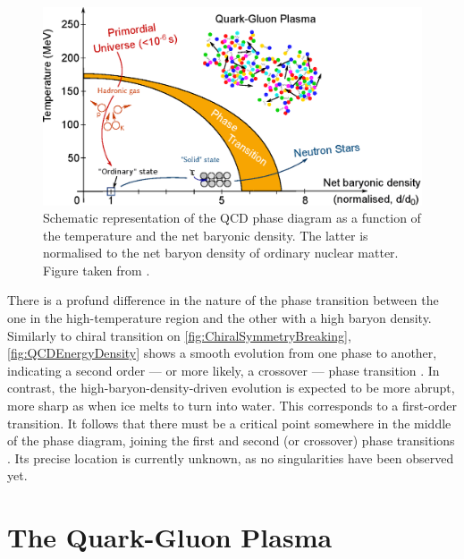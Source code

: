 \begin{figure}[!p]
	\centering
	\includegraphics[width=\textwidth]{Figs/Chapter2/DiagrPhase.eps}
	\caption{Schematic representation of the QCD phase diagram as a function of the temperature and the net baryonic density. The latter is normalised to the net baryon density of ordinary nuclear matter. Figure taken from \cite{mairePhaseDiagramQCD2015}.}
	\label{fig:QCDPhaseDiagram}
\end{figure}

There is a profund difference in the nature of the phase transition between the one in the high-temperature region and the other with a high baryon density. Similarly to chiral transition on \fig\ref{fig:ChiralSymmetryBreaking}, \fig\ref{fig:QCDEnergyDensity} shows a smooth evolution from one phase to another, indicating a second order --- or more likely, a crossover --- phase transition \cite{philipsenQCDEquationState2013}. In contrast, the high-baryon-density-driven evolution is expected to be more abrupt, more sharp as when ice melts to turn into water. This corresponds to a first-order transition. It follows that there must be a critical point somewhere in the middle of the phase diagram, joining the first and second (or crossover) phase transitions \cite{stephanovQCDPhaseDiagram2005}. Its precise location is currently unknown, as no singularities have been observed yet.


\section{The Quark-Gluon Plasma}
\label{sec:QGP}

